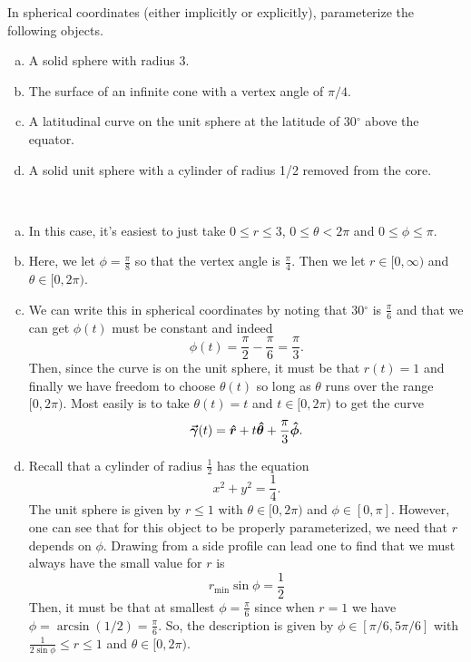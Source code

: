 \documentclass[12pt]{article} %
\newcommand{\rhat}{\boldsymbol{\hat{r}}}
\newcommand{\thetahat}{\boldsymbol{\hat{\theta}}}
\newcommand{\phihat}{\boldsymbol{\hat{\phi}}}
\begin{document}
\newpage
\begin{problem}
	In spherical coordinates (either implicitly or explicitly), parameterize the following objects.
	\begin{enumerate}[(a)]
		\item A solid sphere with radius 3.
		\item The surface of an infinite cone with a vertex angle of $\pi/4$.
		\item A latitudinal curve on the unit sphere at the latitude of 30$^\circ$ above the equator.
		\item A solid unit sphere with a cylinder of radius 1/2 removed from the core.
	\end{enumerate}
\end{problem}
\begin{solution} ~
 \begin{enumerate}[(a)]
    \item In this case, it's easiest to just take $0\leq r \leq 3$, $0\leq \theta < 2\pi$ and $0\leq \phi \leq \pi$.  
    \item Here, we let $\phi=\frac{\pi}{8}$ so that the vertex angle is $\frac{\pi}{4}$.  Then we let $r\in [0,\infty)$ and $\theta \in [0,2\pi)$.
    \item We can write this in spherical coordinates by noting that 30$^\circ$ is $\frac{\pi}{6}$ and that we can get $\phi(t)$ must be constant and indeed 
    \[
    \phi(t) = \frac{\pi}{2}-\frac{\pi}{6}=\frac{\pi}{3}.
    \]
    Then, since the curve is on the unit sphere, it must be that $r(t)=1$ and finally we have freedom to choose $\theta(t)$ so long as $\theta$ runs over the range $[0,2\pi)$. Most easily is to take $\theta(t)=t$ and $t\in [0,2\pi)$ to get the curve
    \[
    \curvegamma(t) = \rhat + t \thetahat +\frac{\pi}{3} \phihat.
    \]
    \item Recall that a cylinder of radius $\frac{1}{2}$ has the equation
    \[
    x^2+y^2=\frac{1}{4}.
    \]
    The unit sphere is given by $r\leq 1$ with $\theta \in [0,2\pi)$ and $\phi \in [0,\pi]$. However, one can see that for this object to be properly parameterized, we need that $r$ depends on $\phi$.  Drawing from a side profile can lead one to find that we must always have the small value for $r$ is
    \[
    r_{\textrm{min}} \sin \phi = \frac{1}{2}
    \]
    Then, it must be that at smallest $\phi = \frac{\pi}{6}$ since when $r=1$ we have $\phi = \arcsin(1/2) = \frac{\pi}{6}$.  So, the description is given by $\phi \in [\pi/6, 5\pi/6]$ with $\frac{1}{2\sin \phi} \leq r \leq 1$ and $\theta \in [0,2\pi)$.
 \end{enumerate}
\end{solution}
\end{document}
